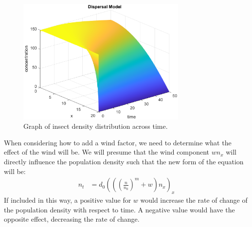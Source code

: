\documentclass[]{article}
\begin{document}
	\begin{figure}[h]
		\centering
		\includegraphics[width = 0.75\textwidth]{images/dispersal.eps}
		\caption{Graph of insect density distribution across time.}
	\end{figure}
	\newpage
	When considering how to add a wind factor, we need to determine what the effect of the wind will be. We will presume that the wind component $wn_x$ will directly influence the population density such that the new form of the equation will be:
	\begin{align}
		n_t &= d_0 \left( \left( \left(\frac{n}{n_0}\right)^m + w \right) n_x \right)_x 
	\end{align}
	If included in this way, a positive value for $w$ would increase the rate of change of the population density with respect to time. A negative value would have the opposite effect, decreasing the rate of change.  
\end{document}
